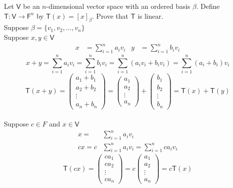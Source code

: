 Let $\mathsf{V}$ be an $n$-dimensional vector space with an ordered
basis $\beta$. Define $\mathsf{T}\colon\mathsf{V}\to\mathsf{F}^n$ by
$\mathsf{T}(x) = \left[x\right]_\beta$. Prove that $\mathsf{T}$ is linear.
\\
Suppose $\beta =\{v_1,v_2,\dots,v_n\}$
\\Suppose $x,y \in \mathsf{V}$ 
\begin{align}
x &= \sum\limits^n_{i=1} a_iv_i & y &= \sum\limits^n_{i=1} b_iv_i 
\end{align}
\begin{equation}
x + y = \sum\limits^n_{i=1} a_iv_i = \sum\limits^n_{i=1} b_iv_i  =
\sum\limits^n_{i=1}(a_iv_i + b_iv_i) = \sum\limits^n_{i=1} \left(a_i
  +b_i\right) v_i
\end{equation}
\begin{equation}
\mathsf{T}(x+y) = \begin{pmatrix}a_1+b_1\\a_2+b_2\\\vdots\\a_n+b_n\end{pmatrix}
= \begin{pmatrix}a_1\\a_2\\\vdots\\a_n\end{pmatrix}
+\begin{pmatrix}b_1\\b_2\\\vdots\\b_n\end{pmatrix} = \mathsf{T}(x) +
\mathsf{T}(y)
\end{equation}
\\Suppose $c \in F$ and $x \in \mathsf{V}$ 
\begin{align}
x = &\sum\limits^n_{i=1} a_iv_i\\
cx = c&\sum\limits^n_{i=1} a_iv_i = \sum\limits^n_{i=1} ca_iv_i
\end{align}
\begin{equation}
\mathsf{T}(cx) = \begin{pmatrix}ca_1\\ca_2\\\vdots\\ca_n\end{pmatrix}
= c\begin{pmatrix}a_1\\a_2\\\vdots\\a_n\end{pmatrix} = c\mathsf{T}(x)
\end{equation}
